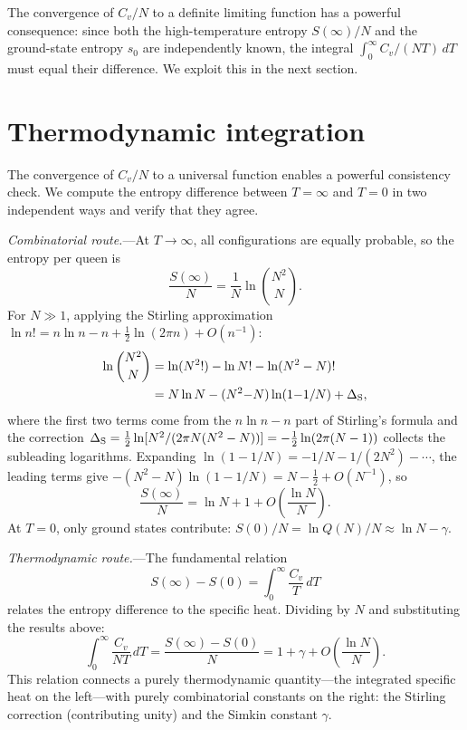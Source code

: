 \documentclass[aps, pre, reprint, amsmath, amssymb, superscriptaddress, floatfix]{revtex4-2}
\begin{document}
The convergence of $C_v/N$ to a definite limiting function has a
powerful consequence: since both the high-temperature entropy
$S(\infty)/N$ and the ground-state entropy $s_0$ are independently
known, the integral $\int_0^\infty C_v/(NT)\,dT$ must equal their
difference.  We exploit this in the next section.


\section{Thermodynamic integration}
\label{sec:thermo_int}

The convergence of $C_v/N$ to a universal function enables a powerful
consistency check.  We compute the entropy
difference between $T = \infty$ and $T = 0$ in two independent ways
and verify that they agree.

\textit{Combinatorial route.}---At $T \to \infty$, all configurations
are equally probable, so the entropy per queen is
\begin{equation}
  \frac{S(\infty)}{N}
  = \frac{1}{N}\ln\binom{N^2}{N}.
  \label{eq:Sinf_def}
\end{equation}
For $N \gg 1$, applying the Stirling approximation
$\ln n! = n\ln n - n + \tfrac{1}{2}\ln(2\pi n) + O(n^{-1})$:
\begin{align}
  \ln\binom{N^2}{N}
  &= \ln(N^2!) - \ln N! - \ln(N^2 - N)! \notag\\
  &= N\ln N - (N^2{-}N)\ln(1{-}1/N)
  + \Delta_{\rm S},
  \label{eq:Sinf_stirling}
\end{align}
where the first two terms come from the $n\ln n - n$ part of Stirling's
formula and the correction
$\Delta_{\rm S} = \tfrac{1}{2}\ln[N^2/(2\pi N(N^2-N))]
= -\tfrac{1}{2}\ln(2\pi(N-1))$ collects the subleading logarithms.
Expanding $\ln(1 - 1/N) = -1/N - 1/(2N^2) - \cdots$, the
leading terms give $-(N^2-N)\ln(1-1/N) = N - \tfrac{1}{2} + O(N^{-1})$,
so
\begin{equation}
  \frac{S(\infty)}{N}
  = \ln N + 1 + O\!\left(\frac{\ln N}{N}\right).
  \label{eq:Sinf}
\end{equation}
At $T = 0$, only ground states contribute:
$S(0)/N = \ln Q(N)/N \approx \ln N - \gamma$.

\textit{Thermodynamic route.}---The fundamental relation
\begin{equation}
  S(\infty) - S(0) = \int_0^\infty \frac{C_v}{T}\,dT
  \label{eq:thermo_int}
\end{equation}
relates the entropy difference to the specific heat.  Dividing by $N$
and substituting the results above:
\begin{equation}
  \int_0^\infty \frac{C_v}{NT}\,dT
  = \frac{S(\infty) - S(0)}{N}
  = 1 + \gamma + O\!\left(\frac{\ln N}{N}\right).
  \label{eq:DS}
\end{equation}
This relation connects a purely thermodynamic quantity---the
integrated specific heat on the left---with purely combinatorial
constants on the right: the Stirling correction (contributing unity)
and the Simkin constant $\gamma$.
\end{document}
